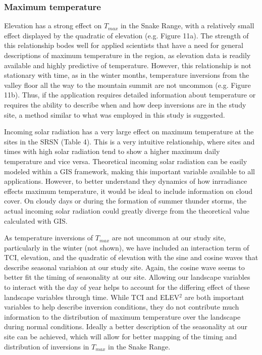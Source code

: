 \documentclass{ametsoc}
\begin{document}
\subsubsection{Maximum temperature}
Elevation has a strong effect on $T_{max}$ in the Snake Range, with a relatively
small effect displayed by the quadratic of elevation (e.g. Figure 11a). The
strength of this relationship bodes well for applied scientists that have a need
for general descriptions of maximum temperature in the region, as elevation data
is readily available and highly predictive of temperature. However, this
relationship is not stationary with time, as in the winter months, temperature
inversions from the valley floor all the way to the mountain summit are not
uncommon (e.g. Figure 11b). Thus, if the application requires detailed
information about temperature or requires the ability to describe when and how
deep inversions are in the study site, a method similar to what was employed in
this study is suggested.

Incoming solar radiation has a very large effect on maximum temperature at the
sites in the SRSN (Table 4). This is a very intuitive relationship, where sites
and times with high solar radiation tend to show a higher maximum daily
temperature and vice versa. Theoretical incoming solar radiation can be easily
modeled within a GIS framework, making this important variable available to all
applications. However, to better understand they dynamics of how inrradiance
effects maximum temperature, it would be ideal to include information on cloud
cover. On cloudy days or during the formation of summer thunder storms, the
actual incoming solar radiation could greatly diverge from the theoretical value
calculated with GIS.

As temperature inversions of $T_{max}$ are not uncommon at our study site,
particularly in the winter (not shown), we have included an interaction term of
TCI, elevation, and the quadratic of elevation with the sine and cosine waves
that describe seasonal variabion at our study site. Again, the cosine wave seems
to better fit the timing of seasonality at our site. Allowing our landscape
variables to interact with the day of year helps to account for the differing
effect of these landscape variables through time. While TCI and ELEV$^2$ are
both important variables to help describe inversion conditions, they do not
contribute much information to the distribution of maximum temperature over the
landscape during normal conditions. Ideally a better description of the
seasonality at our site can be achieved, which will allow for better mapping of
the timing and distribution of inversions in $T_{max}$ in the Snake Range.
\end{document}
